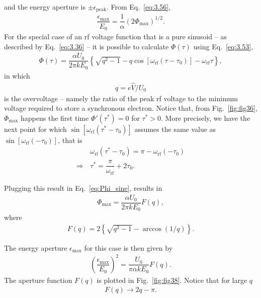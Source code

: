  and the energy aperture is $\pm\epsilon_\text{peak}$. From Eq.~\eqref{eq:3.56},
\begin{align}
	\dfrac{\epsilon_{\max}}{E_0} = \dfrac{1}{\alpha} (2 \Phi_{\max})^{1/2}.
\end{align}
For the special case of an rf voltage function that is a pure sinusoid -- as described by Eq.~\eqref{eq:3.36} -- it is possible to calculate $\Phi(\tau)$ using Eq.~\eqref{eq:3.53},
\begin{align}\label{eq:Phi_sine}
	\Phi(\tau) = \dfrac{\alpha U_0}{2\pi k E_0} \left\lbrace \sqrt{q^2-1} - q \cos [\omega_{\text{rf}}(\tau - \tau_0)] - \omega_{\text{rf}} \tau \right\rbrace,
\end{align}
in which
\begin{align} \label{eq:3.60}
q = e\hat{V}/U_0
\end{align}
is the overvoltage -- namely the ratio of the peak rf voltage to the minimum voltage required to store a synchronous electron. Notice that, from Fig.~\ref{fig:fig36}, $\Phi_{\max}$ happens the first time $\Phi'(\tau^*) = 0$ for $\tau^* > 0$. More precisely, we have the next point for which $\sin[\omega_{\text{rf}}(\tau^*-\tau_0)]$ assumes the same value as $\sin[\omega_{\text{rf}}(-\tau_0)]$, that is
\begin{align*}
	& \omega_{\text{rf}}(\tau^* - \tau_0) = \pi - \omega_{\text{rf}}(-\tau_0) \\
    \Rightarrow \, & \tau^* = \dfrac{\pi}{\omega_{\text{rf}}} + 2\tau_0.
\end{align*}

Plugging this result in Eq.~\eqref{eq:Phi_sine}, results in
\begin{align} \label{eq:3.58}
	\Phi_{\max} = \dfrac{\alpha U_0}{2\pi k E_0} F(q),
\end{align}
where
\begin{align}
	F(q) = 2\left\lbrace \sqrt{q^2 - 1} - \arccos(1/q) \right\rbrace.
\end{align}

The energy aperture $\epsilon_{\max}$ for this case is then given by
\begin{align}
	\left(\dfrac{\epsilon_{\max}}{E_0}\right)^2 = \dfrac{U_0}{\pi \alpha k E_0} F(q).
\end{align}
The aperture function $F(q)$ is plotted in Fig.~\ref{fig:fig38}. Notice that for large $q$
\begin{align}
	F(q) \to 2q - \pi.
\end{align}

